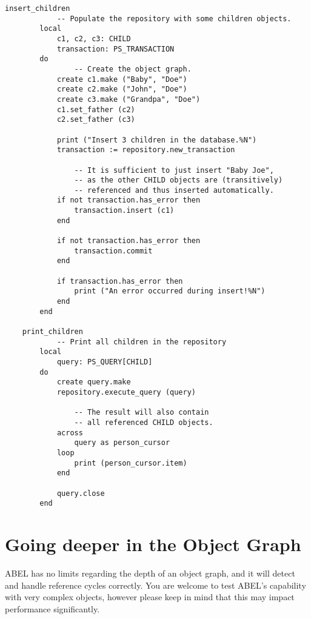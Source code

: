 \documentclass[a4paper,12pt]{report}
\begin{document}
\begin{lstlisting}[language=OOSC2Eiffel, captionpos=b, caption={Dealing with object graphs.}, label={lst:references_handling}]
	insert_children
			-- Populate the repository with some children objects.
		local
			c1, c2, c3: CHILD
			transaction: PS_TRANSACTION
		do
				-- Create the object graph.
			create c1.make ("Baby", "Doe")
			create c2.make ("John", "Doe")
			create c3.make ("Grandpa", "Doe")
			c1.set_father (c2)
			c2.set_father (c3)

			print ("Insert 3 children in the database.%N")
			transaction := repository.new_transaction

				-- It is sufficient to just insert "Baby Joe", 
				-- as the other CHILD objects are (transitively) 
				-- referenced and thus inserted automatically.
			if not transaction.has_error then
				transaction.insert (c1)
			end

			if not transaction.has_error then
				transaction.commit
			end

			if transaction.has_error then
				print ("An error occurred during insert!%N")
			end
		end

	print_children
			-- Print all children in the repository
		local
			query: PS_QUERY[CHILD]
		do
			create query.make
			repository.execute_query (query)
			
				-- The result will also contain
				-- all referenced CHILD objects.
			across
				query as person_cursor
			loop
				print (person_cursor.item)
			end

			query.close
		end
\end{lstlisting}
 
\section{Going deeper in the Object Graph}
\label{sec:going_deeper_in_object_graph}
ABEL has no limits regarding the depth of an object graph, and it will detect and handle reference cycles correctly. 
You are welcome to test ABEL's capability with very complex objects, however please keep in mind that this may impact performance significantly.

\end{document}
